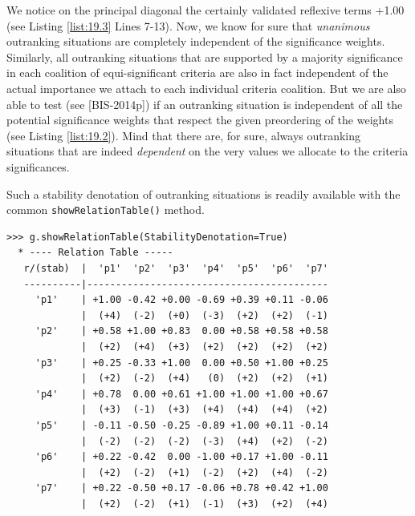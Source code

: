 We notice on the principal diagonal the certainly validated reflexive terms +1.00 (see Listing \ref{list:19.3} Lines 7-13). Now, we know for sure that \emph{unanimous} outranking situations are completely independent of the significance weights. Similarly, all outranking situations that are supported by a majority significance in each coalition of equi-significant criteria are also in fact independent of the actual importance we attach to each individual criteria coalition. But we are also able to test (see [BIS-2014p]) if an outranking situation is independent of all the potential significance weights that respect the given preordering of the weights (see Listing \ref{list:19.2}). Mind that there are, for sure, always outranking situations that are indeed \emph{dependent} on the very values we allocate to the criteria significances.

Such a stability denotation of outranking situations is readily available with the common \texttt{showRelationTable()} method.

\begin{lstlisting}[caption={Relation Table with Stability Denotation},label=list:19.4]
>>> g.showRelationTable(StabilityDenotation=True)
  * ---- Relation Table -----
   r/(stab)  |  'p1'  'p2'  'p3'  'p4'  'p5'  'p6'  'p7'   
   ----------|------------------------------------------
     'p1'    | +1.00 -0.42 +0.00 -0.69 +0.39 +0.11 -0.06  
             |  (+4)  (-2)  (+0)  (-3)  (+2)  (+2)  (-1)  
     'p2'    | +0.58 +1.00 +0.83  0.00 +0.58 +0.58 +0.58  
             |  (+2)  (+4)  (+3)  (+2)  (+2)  (+2)  (+2)  
     'p3'    | +0.25 -0.33 +1.00  0.00 +0.50 +1.00 +0.25  
             |  (+2)  (-2)  (+4)   (0)  (+2)  (+2)  (+1)  
     'p4'    | +0.78  0.00 +0.61 +1.00 +1.00 +1.00 +0.67  
             |  (+3)  (-1)  (+3)  (+4)  (+4)  (+4)  (+2)  
     'p5'    | -0.11 -0.50 -0.25 -0.89 +1.00 +0.11 -0.14  
             |  (-2)  (-2)  (-2)  (-3)  (+4)  (+2)  (-2)  
     'p6'    | +0.22 -0.42  0.00 -1.00 +0.17 +1.00 -0.11
             |  (+2)  (-2)  (+1)  (-2)  (+2)  (+4)  (-2)  
     'p7'    | +0.22 -0.50 +0.17 -0.06 +0.78 +0.42 +1.00  
             |  (+2)  (-2)  (+1)  (-1)  (+3)  (+2)  (+4)  
\end{lstlisting}
           

